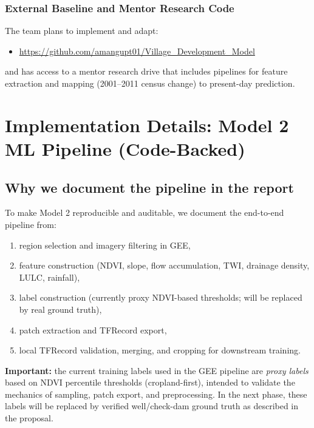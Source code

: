 \documentclass[12pt,a4paper]{report}
\begin{document}
\subsection{External Baseline and Mentor Research Code}
The team plans to implement and adapt:
\begin{itemize}
  \item \url{https://github.com/amangupt01/Village_Development_Model}
\end{itemize}
and has access to a mentor research drive that includes pipelines for feature extraction and mapping (2001--2011 census change) to present-day prediction.

\chapter{Implementation Details: Model 2 ML Pipeline (Code-Backed)}

\section{Why we document the pipeline in the report}
To make Model 2 reproducible and auditable, we document the end-to-end pipeline from:
\begin{enumerate}
  \item region selection and imagery filtering in GEE,
  \item feature construction (NDVI, slope, flow accumulation, TWI, drainage density, LULC, rainfall),
  \item label construction (currently proxy NDVI-based thresholds; will be replaced by real ground truth),
  \item patch extraction and TFRecord export,
  \item local TFRecord validation, merging, and cropping for downstream training.
\end{enumerate}

\begin{wiseNote}
\textbf{Important:} the current training labels used in the GEE pipeline are \emph{proxy labels} based on NDVI percentile thresholds (cropland-first), intended to validate the mechanics of sampling, patch export, and preprocessing. In the next phase, these labels will be replaced by verified well/check-dam ground truth as described in the proposal.
\end{wiseNote}
\end{document}
